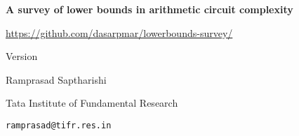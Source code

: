 \documentclass[12pt]{report}
\begin{document}
\begin{titlepage}
  \vspace*{4cm}
  \begin{center}
    {\Huge {\bf A survey of lower bounds in arithmetic circuit complexity}}
  
    \vspace*{2cm}

    {\large \url{https://github.com/dasarpmar/lowerbounds-survey/}}
    
    {\large Version \currentversion}
    
    {}

    \vfill
    
    {\Large Ramprasad Saptharishi}

    {\large Tata Institute of Fundamental Research}

    {\large \texttt{ramprasad@tifr.res.in}}
    
    \ccbyncsa
\end{center}

\end{titlepage}


\end{document}
